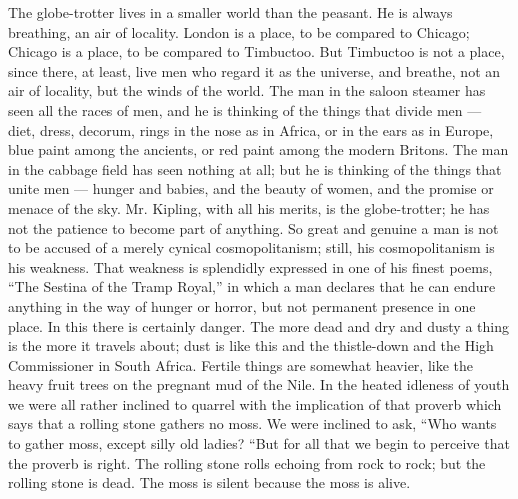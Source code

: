 The globe-trotter lives in a smaller world than the peasant. He is always breathing, an air of locality. London is a place, to be compared to Chicago; Chicago is a place, to be compared to Timbuctoo. But Timbuctoo is not a place, since there, at least, live men who regard it as the universe, and breathe, not an air of locality, but the winds of the world. The man in the saloon steamer has seen all the races of men, and he is thinking of the things that divide men — diet, dress, decorum, rings in the nose as in Africa, or in the ears as in Europe, blue paint among the ancients, or red paint among the modern Britons. The man in the cabbage field has seen nothing at all; but he is thinking of the things that unite men — hunger and babies, and the beauty of women, and the promise or menace of the sky. Mr. Kipling, with all his merits, is the globe-trotter; he has not the patience to become part of anything. So great and genuine a man is not to be accused of a merely cynical cosmopolitanism; still, his cosmopolitanism is his weakness. That weakness is splendidly expressed in one of his finest poems, “The Sestina of the Tramp Royal,” in which a man declares that he can endure anything in the way of hunger or horror, but not permanent presence in one place. In this there is certainly danger. The more dead and dry and dusty a thing is the more it travels about; dust is like this and the thistle-down and the High Commissioner in South Africa. Fertile things are somewhat heavier, like the heavy fruit trees on the pregnant mud of the Nile. In the heated idleness of youth we were all rather inclined to quarrel with the implication of that proverb which says that a rolling stone gathers no moss. We were inclined to ask, “Who wants to gather moss, except silly old ladies? “But for all that we begin to perceive that the proverb is right. The rolling stone rolls echoing from rock to rock; but the rolling stone is dead. The moss is silent because the moss is alive.

